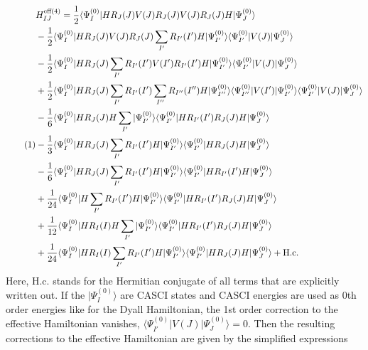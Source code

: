 	\begin{align*}
  &H_{IJ}^{{\text{eff}}(4)} = \frac{1}{2}\langle \Psi _I^{(0)}|H{R_J}(J)V(J){R_J}(J)V(J){R_J}(J)H|\Psi _J^{(0)}\rangle  \hfill \\
   &- \frac{1}{2}\langle \Psi _I^{(0)}|H{R_J}(J)V(J){R_J}(J)\sum\limits_{I'} {{R_{I'}}} (I')H|\Psi _{I'}^{(0)}\rangle \langle \Psi _{I'}^{(0)}|V(J)|\Psi _J^{(0)}\rangle  \hfill \\
   &- \frac{1}{2}\langle \Psi _I^{(0)}|H{R_J}(J)\sum\limits_{I'} {{R_{I'}}} (I')V(I'){R_{I'}}(I')H|\Psi _{I'}^{(0)}\rangle \langle \Psi _{I'}^{(0)}|V(J)|\Psi _J^{(0)}\rangle  \hfill \\
   &+ \frac{1}{2}\langle \Psi _I^{(0)}|H{R_J}(J)\sum\limits_{I'} {{R_{I'}}} (I')\sum\limits_{I''} {{R_{I''}}} (I'')H|\Psi _{I''}^{(0)}\rangle \langle \Psi _{I''}^{(0)}|V(I')|\Psi _{I'}^{(0)}\rangle \langle \Psi _{I'}^{(0)}|V(J)|\Psi _J^{(0)}\rangle  \hfill \\
   &- \frac{1}{6}\langle \Psi _I^{(0)}|H{R_J}(J)H\sum\limits_{I'} {|\Psi _{I'}^{(0)}\rangle \langle \Psi _{I'}^{(0)}|H{R_{I'}}(I')} {R_J}(J)H|\Psi _J^{(0)}\rangle  \hfill \\ \stepcounter{equation}\tag{\theequation}
   &- \frac{1}{3}\langle \Psi _I^{(0)}|H{R_J}(J)\sum\limits_{I'} {{R_{I'}}(I')H|\Psi _{I'}^{(0)}\rangle \langle \Psi _{I'}^{(0)}|H} {R_J}(J)H|\Psi _J^{(0)}\rangle  \hfill \\
   &- \frac{1}{6}\langle \Psi _I^{(0)}|H{R_J}(J)\sum\limits_{I'} {{R_{I'}}(I')H|\Psi _{I'}^{(0)}\rangle \langle \Psi _{I'}^{(0)}|H} {R_{I'}}(I')H|\Psi _J^{(0)}\rangle  \hfill \\
   &+ \frac{1}{{24}}\langle \Psi _I^{(0)}|H\sum\limits_{I'} {{R_{I'}}} (I')H|\Psi _{I'}^{(0)}\rangle \langle \Psi _{I'}^{(0)}|H{R_{I'}}(I'){R_J}(J)H|\Psi _J^{(0)}\rangle  \hfill \\
   &+ \frac{1}{{12}}\langle \Psi _I^{(0)}|H{R_I}(I)H\sum\limits_{I'} {|\Psi _{I'}^{(0)}\rangle \langle \Psi _{I'}^{(0)}|H{R_{I'}}} (I'){R_J}(J)H|\Psi _J^{(0)}\rangle  \hfill \\
   &+ \frac{1}{{24}}\langle \Psi _I^{(0)}|H{R_I}(I)\sum\limits_{I'} {{R_{I'}}} (I')H|\Psi _{I'}^{(0)}\rangle \langle \Psi _{I'}^{(0)}|H{R_J}(J)H|\Psi _J^{(0)}\rangle  + {\text{H}}{\text{.c}}{\text{.}} \hfill \\ 
\end{align*}
Here, H.c. stands for the Hermitian conjugate of all terms that are explicitly written out. If the $|\Psi _I^{(0)}\rangle $ are CASCI states and CASCI energies are used as 0th order energies like for the Dyall Hamiltonian, the 1st order correction to the effective Hamiltonian vanishes, $\langle \Psi _{I'}^{(0)}|V(J)|\Psi _J^{(0)}\rangle  = 0.$ Then the resulting corrections to the effective Hamiltonian are given by the simplified expressions
